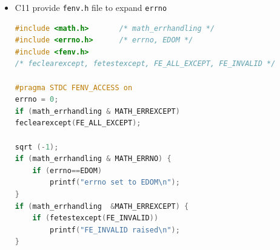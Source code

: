 \documentclass[a4paper,11pt,twoside]{book}
\begin{document}
\begin{itemize}
\item C11 provide \texttt{fenv.h} file to expand \texttt{errno}
\begin{lstlisting}[frame=single, language=c++]
#include <math.h>       /* math_errhandling */
#include <errno.h>      /* errno, EDOM */
#include <fenv.h>
/* feclearexcept, fetestexcept, FE_ALL_EXCEPT, FE_INVALID */
	
#pragma STDC FENV_ACCESS on
errno = 0;
if (math_errhandling & MATH_ERREXCEPT)
feclearexcept(FE_ALL_EXCEPT);
	
sqrt (-1);
if (math_errhandling & MATH_ERRNO) {
	if (errno==EDOM) 
		printf("errno set to EDOM\n");
}	
if (math_errhandling  &MATH_ERREXCEPT) {
	if (fetestexcept(FE_INVALID)) 
		printf("FE_INVALID raised\n");
}
\end{lstlisting}
	
\end{itemize}
\end{document}
